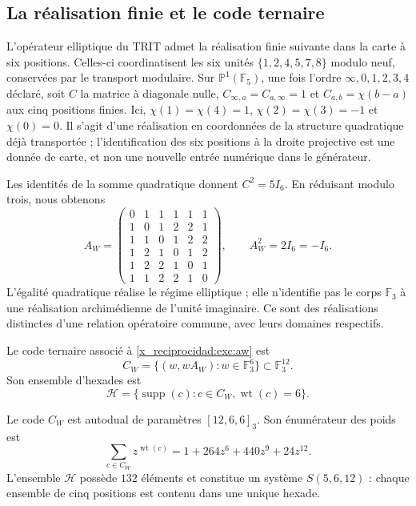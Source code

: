 \subsection{La réalisation finie et le code ternaire}
\label{x_reciprocidad:exc:paley-codigo}

L'opérateur elliptique du TRIT admet la réalisation finie suivante dans la carte à six positions. Celles-ci coordinatisent les six unités $\{1,2,4,5,7,8\}$ modulo neuf, conservées par le transport modulaire. Sur $\mathbb P^1(\mathbb F_5)$, une fois l'ordre $\infty,0,1,2,3,4$ déclaré, soit $C$ la matrice à diagonale nulle, $C_{\infty,a}=C_{a,\infty}=1$ et $C_{a,b}=\chi(b-a)$ aux cinq positions finies. Ici, $\chi(1)=\chi(4)=1$, $\chi(2)=\chi(3)=-1$ et $\chi(0)=0$. Il s'agit d'une réalisation en coordonnées de la structure quadratique déjà transportée ; l'identification des six positions à la droite projective est une donnée de carte, et non une nouvelle entrée numérique dans le générateur.

Les identités de la somme quadratique donnent $C^2=5I_6$. En réduisant modulo
trois, nous obtenons
\begin{equation}
 A_W=
 \begin{pmatrix}
 0&1&1&1&1&1\\
 1&0&1&2&2&1\\
 1&1&0&1&2&2\\
 1&2&1&0&1&2\\
 1&2&2&1&0&1\\
 1&1&2&2&1&0
 \end{pmatrix},
 \qquad A_W^2=2I_6=-I_6.
 \label{x_reciprocidad:exc:aw}
\end{equation}
L'égalité quadratique réalise le régime elliptique ; elle n'identifie pas le
corps $\mathbb F_3$ à une réalisation archimédienne de l'unité
imaginaire. Ce sont des réalisations distinctes d'une relation opératoire
commune, avec leurs domaines respectifs.

\begin{definition}
\label{x_reciprocidad:exc:codigo}
Le code ternaire associé à \eqref{x_reciprocidad:exc:aw} est
\[
 C_W=\{(w,wA_W):w\in\mathbb F_3^6\}
       \subset\mathbb F_3^{12}.
\]
Son ensemble d'hexades est
\[
 \mathcal H=
 \{\operatorname{supp}(c):c\in C_W,
                           \operatorname{wt}(c)=6\}.
\]
\end{definition}

\begin{proposition}
\label{x_reciprocidad:exc:codigo-witt}
Le code $C_W$ est autodual de paramètres $[12,6,6]_3$. Son énumérateur
des poids est
\begin{equation}
 \sum_{c\in C_W}z^{\operatorname{wt}(c)}
   =1+264z^6+440z^9+24z^{12}.
 \label{x_reciprocidad:exc:enumerador}
\end{equation}
L'ensemble $\mathcal H$ possède $132$ éléments et constitue un système
$S(5,6,12)$ : chaque ensemble de cinq positions est contenu dans une
unique hexade.
\end{proposition}

